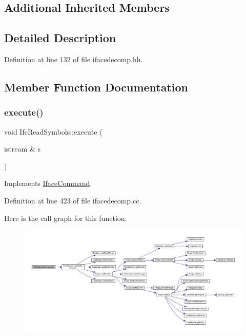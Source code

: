 \subsection*{Additional Inherited Members}


\subsection{Detailed Description}


Definition at line 132 of file ifacedecomp.\+hh.



\subsection{Member Function Documentation}
\mbox{\label{class_ifc_read_symbols_a5e0b66be5caec5f99dd8c11e31826e5a}} 
\subsubsection{\texorpdfstring{execute()}{execute()}}
{\footnotesize\ttfamily void Ifc\+Read\+Symbols\+::execute (\begin{DoxyParamCaption}\item[{istream \&}]{s }\end{DoxyParamCaption})\hspace{0.3cm}{\ttfamily [virtual]}}



Implements \mbox{\hyperlink{class_iface_command_af10e29cee2c8e419de6efe9e680ad201}{Iface\+Command}}.



Definition at line 423 of file ifacedecomp.\+cc.

Here is the call graph for this function\+:
\nopagebreak
\begin{figure}[H]
\begin{center}
\leavevmode
\includegraphics[width=350pt]{class_ifc_read_symbols_a5e0b66be5caec5f99dd8c11e31826e5a_cgraph}
\end{center}
\end{figure}


